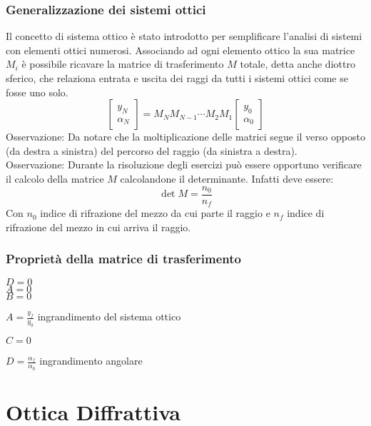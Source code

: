 \documentclass{article}
\begin{document}
\subsubsection*{Generalizzazione dei sistemi ottici}
Il concetto di sistema ottico è stato introdotto per semplificare l'analisi di sistemi con elementi ottici numerosi. Associando ad ogni elemento ottico la sua matrice $M_i$ è possibile ricavare la matrice di trasferimento $M$ totale, detta anche diottro sferico, che relaziona entrata e uscita dei raggi da tutti i sistemi ottici come se fosse uno solo.
\[
\begin{bmatrix}
y_N\\
\alpha_N
\end{bmatrix}
=
M_N M_{N-1} \cdots M_2 M_1
\begin{bmatrix}
y_0\\
\alpha_0
\end{bmatrix}
\]
Osservazione:
Da notare che la moltiplicazione delle matrici segue il verso opposto (da destra a sinistra) del percorso del raggio (da sinistra a destra).\\
Osservazione:
Durante la risoluzione degli esercizi può essere opportuno verificare il calcolo della matrice $M$ calcolandone il determinante. Infatti deve essere:
\begin{equation*}
\det M = \frac{n_0}{n_f}
\end{equation*}
Con $n_0$ indice di rifrazione del mezzo da cui parte il raggio e $n_f$ indice di rifrazione del mezzo in cui arriva il raggio.

\subsubsection*{Proprietà della matrice di trasferimento}
$D = 0$\\
$A = 0$\\
$B = 0$\\
\centerline{$A = \frac{y_f}{y_0}$ \qquad ingrandimento del sistema ottico}
$C = 0$\\
\centerline{$D = \frac{\alpha_f}{\alpha_0}$	\qquad ingrandimento angolare}

\newpage

\section*{Ottica Diffrattiva}
\end{document}
